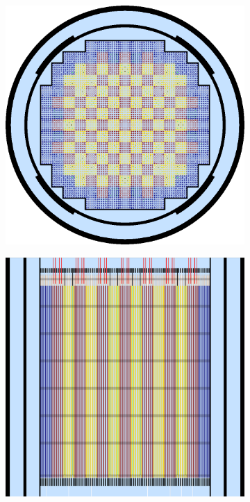 \begin{figure}[h!]
\begin{subfigure}{0.45\textwidth}
  \centering
  \includegraphics[width=\linewidth]{figures/workflow/openmc/core}
  \caption{}
\end{subfigure}%
\begin{subfigure}{0.45\textwidth}
  \centering
  \includegraphics[width=\linewidth]{figures/workflow/openmc/core_axial}

\end{subfigure}
\end{figure}
